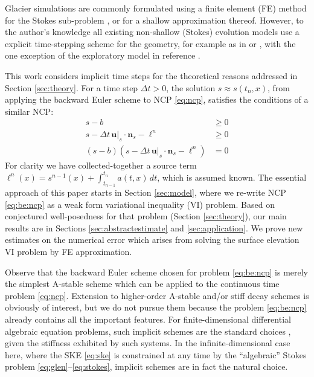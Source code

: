 \documentclass[hidelinks,onefignum,onetabnum,final]{siamart220329}  %
\newcommand{\bn}{\mathbf{n}}
\newcommand{\bu}{\mathbf{u}}
\begin{document}
Glacier simulations are commonly formulated using a finite element (FE) method for the Stokes sub-problem \cite{IsaacStadlerGhattas2015,Jouvetetal2008,Pattynetal2008}, or for a shallow approximation thereof.  However, to the author's knowledge all existing non-shallow (Stokes) evolution models use a explicit time-stepping scheme for the geometry, for example as in \cite{Jouvetetal2008} or \cite{LofgrenAhlkronaHelanow2022}, with the one exception of the exploratory model in reference \cite{WirbelJarosch2020}.

This work considers implicit time steps for the theoretical reasons addressed in Section \ref{sec:theory}.  For a time step $\Delta t > 0$, the solution $s\approx s(t_n,x)$, from applying the backward Euler scheme to NCP \eqref{eq:ncp}, satisfies the conditions of a similar NCP:
\begin{subequations}
\label{eq:be:ncp}
\begin{align}
s - b &\ge 0 \label{eq:be:ncp:constraint} \\
s - \Delta t\,\bu|_s \cdot \bn_s - \ell^n &\ge 0 \label{eq:be:ncp:residualpos} \\
(s - b) \left(s - \Delta t\,\bu|_s \cdot \bn_s - \ell^n\right) &= 0 \label{eq:be:ncp:complementarity}
\end{align}
\end{subequations}
For clarity we have collected-together a source term $\ell^n(x) = s^{n-1}(x) + \int_{t_{n-1}}^{t_n} a(t,x)\,dt$, which is assumed known.  The essential approach of this paper starts in Section \ref{sec:model}, where we re-write NCP \eqref{eq:be:ncp} as a weak form variational inequality (VI) problem.  Based on conjectured well-posedness for that problem (Section \ref{sec:theory}), our main results are in Sections \ref{sec:abstractestimate} and \ref{sec:application}.  We prove new estimates on the numerical error which arises from solving the surface elevation VI problem by FE approximation.

Observe that the backward Euler scheme chosen for problem \eqref{eq:be:ncp} is merely the simplest A-stable scheme which can be applied to the continuous time problem \eqref{eq:ncp}.  Extension to higher-order A-stable and/or stiff decay \cite{AscherPetzold1998} schemes is obviously of interest, but we do not pursue them because the problem \eqref{eq:be:ncp} already contains all the important features.  For finite-dimensional differential algebraic equation problems, such implicit schemes are the standard choices \cite{AscherPetzold1998}, given the stiffness exhibited by such systems.  In the infinite-dimensional case here, where the SKE \eqref{eq:ske} is constrained at any time by the ``algebraic'' Stokes problem \eqref{eq:glen}--\eqref{eq:stokes}, implicit schemes are in fact the natural choice.
\end{document}

